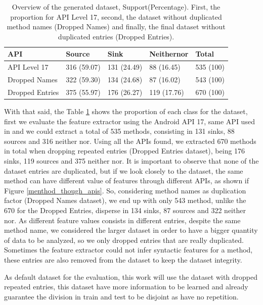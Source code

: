 \begin{table}[hb!]
    \centering
    \renewcommand{\arraystretch}{1.8}
    \begin{tabular}{ p{3cm}p{2.5cm}p{2.5cm}p{2.5cm}p{2cm} }
        \toprule
        API & Source & Sink & Neithernor & Total\\
        \midrule
        API Level 17 & 316 (59.07) & 131 (24.49) & 88 (16.45) & 535 (100)\\
        Dropped Names & 322 (59.30) & 134 (24.68) & 87 (16.02) & 543 (100)\\
        Dropped Entries & 375 (55.97) & 176 (26.27) & 119 (17.76) & 670 (100)\\ [1ex]
        \bottomrule
        \end{tabular}
        \caption{%
        Overview of the generated dataset, Support(Percentage). First, the proportion for API Level 17, second, the dataset without duplicated method names (Dropped Names) and finally, the final dataset without duplicated entries (Dropped Entries).%
        }\label{dset_prop}
\end{table}

With that said, the Table \ref{dset_prop} shows the proportion of each class for the dataset, first we evaluate the feature extractor using the Android API 17, same API used in \cite{rasthofer2014machine} and we could extract a total of 535 methods, consisting in 131 sinks, 88 sources and 316 neither nor. Using all the APIs found, we extracted 670 methods in total when dropping repeated entries (Dropped Entries dataset), being 176 sinks, 119 sources and 375 neither nor. It is important to observe that none of the dataset entries are duplicated, but if we look closely to the dataset, the same method can have different value of features through different APIs, as shown if Figure \ref{menthod_though_apis}. So, considering method names as duplication factor (Dropped Names dataset), we end up with only 543 method, unlike the 670 for the Dropped Entries, disperse in 134 sinks, 87 sources and 322 neither nor. As different feature values consists in different entries, despite the same method name, we considered the larger dataset in order to have a bigger quantity of data to be analyzed, so we only dropped entries that are really duplicated. Sometimes the feature extractor could not infer syntactic features for a method, these entries are also removed from the dataset to keep the dataset integrity.

As default dataset for the evaluation, this work will use the dataset with dropped repeated entries, this dataset have more information to be learned and already guarantee the division in train and test to be disjoint as have no repetition.

